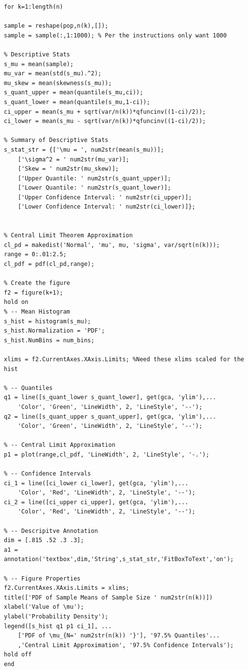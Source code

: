 \documentclass[12pt]{article}
\begin{document}
\begin{verbatim}
for k=1:length(n)

sample = reshape(pop,n(k),[]);
sample = sample(:,1:1000); % Per the instructions only want 1000

% Descriptive Stats
s_mu = mean(sample);
mu_var = mean(std(s_mu).^2);
mu_skew = mean(skewness(s_mu));
s_quant_upper = mean(quantile(s_mu,ci));
s_quant_lower = mean(quantile(s_mu,1-ci));
ci_upper = mean(s_mu + sqrt(var/n(k))*qfuncinv((1-ci)/2));
ci_lower = mean(s_mu - sqrt(var/n(k))*qfuncinv((1-ci)/2));

% Summary of Descriptive Stats
s_stat_str = {['\mu = ', num2str(mean(s_mu))];
    ['\sigma^2 = ' num2str(mu_var)];
    ['Skew = ' num2str(mu_skew)];
    ['Upper Quantile: ' num2str(s_quant_upper)];
    ['Lower Quantile: ' num2str(s_quant_lower)];
    ['Upper Confidence Interval: ' num2str(ci_upper)];
    ['Lower Confidence Interval: ' num2str(ci_lower)]};


% Central Limit Theorem Approximation
cl_pd = makedist('Normal', 'mu', mu, 'sigma', var/sqrt(n(k)));
range = 0:.01:2.5;
cl_pdf = pdf(cl_pd,range);

% Create the figure
f2 = figure(k+1);
hold on
% -- Mean Histogram
s_hist = histogram(s_mu);
s_hist.Normalization = 'PDF';
s_hist.NumBins = num_bins;

xlims = f2.CurrentAxes.XAxis.Limits; %Need these xlims scaled for the hist

% -- Quantiles
q1 = line([s_quant_lower s_quant_lower], get(gca, 'ylim'),...
    'Color', 'Green', 'LineWidth', 2, 'LineStyle', '--');
q2 = line([s_quant_upper s_quant_upper], get(gca, 'ylim'),...
    'Color', 'Green', 'LineWidth', 2, 'LineStyle', '--');

% -- Central Limit Approximation
p1 = plot(range,cl_pdf, 'LineWidth', 2, 'LineStyle', '-.');

% -- Confidence Intervals
ci_1 = line([ci_lower ci_lower], get(gca, 'ylim'),...
    'Color', 'Red', 'LineWidth', 2, 'LineStyle', '--');
ci_2 = line([ci_upper ci_upper], get(gca, 'ylim'),...
    'Color', 'Red', 'LineWidth', 2, 'LineStyle', '--');

% -- Descripitve Annotation
dim = [.815 .52 .3 .3];
a1 = annotation('textbox',dim,'String',s_stat_str,'FitBoxToText','on');

% -- Figure Properties
f2.CurrentAxes.XAxis.Limits = xlims;
title(['PDF of Sample Means of Sample Size ' num2str(n(k))])
xlabel('Value of \mu');
ylabel('Probability Density');
legend([s_hist q1 p1 ci_1], ...
    ['PDF of \mu_{N=' num2str(n(k)) '}'], '97.5% Quantiles'...
    ,'Central Limit Approximation', '97.5% Confidence Intervals');
hold off
end
\end{verbatim}
\end{document}
